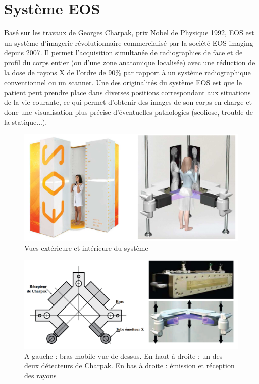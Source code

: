 \newpage

\section{Système EOS}

Basé sur les travaux de Georges Charpak, prix Nobel de Physique 1992, EOS est un système d'imagerie
révolutionnaire commercialisé par la société EOS imaging depuis 2007. Il permet l'acquisition simultanée de
radiographies de face et de profil du corps entier (ou d'une zone anatomique localisée) avec une réduction de la
dose de rayons X de l'ordre de 90\% par rapport à un système radiographique conventionnel ou un scanner. Une
des originalités du système EOS est que le patient peut prendre place dans diverses positions correspondant
aux situations de la vie courante, ce qui permet d'obtenir des images de son corps
\og en charge \fg et donc une visualisation plus précise d'éventuelles pathologies (scoliose, trouble de la statique...).

\begin{figure}[!h]
 \centering \includegraphics[width=0.8\linewidth]{img/td02_01}
 \caption{Vues extérieure et intérieure du système}
 \label{td02_01}
\end{figure}

\begin{figure}[!h]
 \centering \includegraphics[width=0.8\linewidth]{img/td02_02}
 \caption{A gauche : bras mobile vue de dessus. En haut à droite : un des deux détecteurs de Charpak. En bas à droite : émission et réception des rayons}
 \label{td02_02}
\end{figure}

